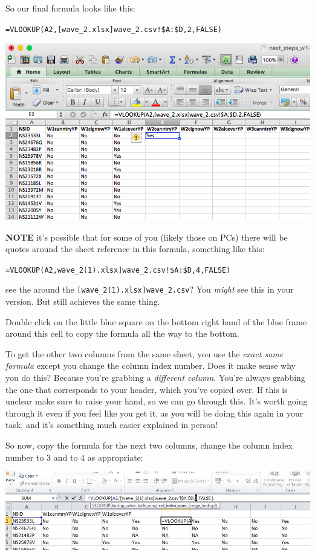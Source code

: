 \documentclass[]{book}
\theoremstyle{definition}
\theoremstyle{definition}
\theoremstyle{definition}
\theoremstyle{remark}
\begin{document}
So our final formula looks like this:

\texttt{=VLOOKUP(A2,{[}wave\_2.xlsx{]}wave\_2.csv!\$A:\$D,2,FALSE)}

\includegraphics{imgs/merge_first_form.png}

\textbf{NOTE} it's possible that for some of you (likely those on PCs)
there will be quotes around the sheet reference in this formula,
something like this:

\texttt{=VLOOKUP(A2,\textquotesingle{}{[}wave\_2(1).xlsx{]}wave\_2.csv\textquotesingle{}!\$A:\$D,4,FALSE)}

see the \texttt{\textquotesingle{}} around the
\texttt{{[}wave\_2(1).xlsx{]}wave\_2.csv}? You \emph{might} see this in
your version. But still achieves the same thing.

Double click on the little blue square on the bottom right hand of the
blue frame around this cell to copy the formula all the way to the
bottom.

To get the other two columns from the same sheet, you use the
\emph{exact same formula} except you change the column index number.
Does it make sense why you do this? Because you're grabbing a
\emph{different column}. You're always grabbing the one that corresponds
to your header, which you've copied over. If this is unclear make sure
to raise your hand, so we can go through this. It's worth going through
it even if you feel like you get it, as you will be doing this again in
your task, and it's something much easier explained in person!

So now, copy the formula for the next two columns, change the column
index number to 3 and to 4 as appropriate:

\includegraphics{imgs/VLOOKUP.jpg}
\end{document}
